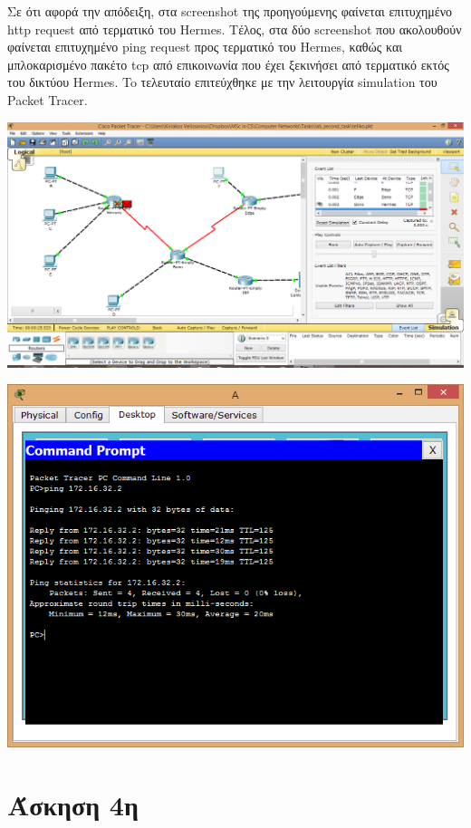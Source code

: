 \documentclass{assignment}
\begin{document}
Σε ότι αφορά την απόδειξη, στα screenshot της προηγούμενης φαίνεται επιτυχημένο
http request από τερματικό του Hermes. Τέλος, στα δύο screenshot που ακολουθούν
φαίνεται επιτυχημένο ping request προς τερματικό του Hermes, καθώς και
μπλοκαρισμένο πακέτο tcp από επικοινωνία που έχει ξεκινήσει από τερματικό
εκτός του δικτύου Hermes. To τελευταίο επιτεύχθηκε με την λειτουργία simulation
του Packet Tracer.
\begin{center}
\includegraphics[width=\textwidth, height=\textheight, keepaspectratio]{images/third.png}
\end{center}
\begin{center}
\includegraphics[width=\textwidth, height=\textheight, keepaspectratio]{images/third2.png}
\end{center}

\section{Άσκηση 4η}
\end{document}

